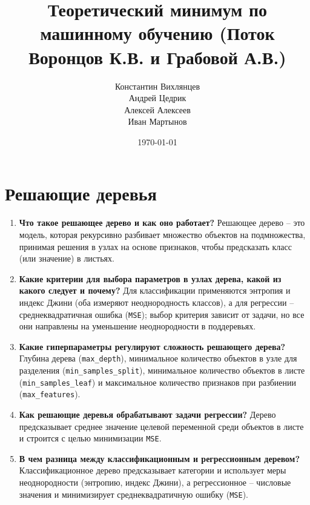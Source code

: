 \documentclass{article}
\title{Теоретический минимум по машинному обучению (Поток Воронцов К.В. и Грабовой А.В.)}
\author{Константин Вихлянцев \\ Андрей Цедрик \\ Алексей Алексеев \\ Иван Мартынов}
\date{\today}
\begin{document}
\maketitle

\newpage

\section{Решающие деревья}
\begin{enumerate}
    \item \textbf{Что такое решающее дерево и как оно работает?} Решающее дерево -- это модель, которая рекурсивно разбивает множество объектов на подмножества, принимая решения в узлах на основе признаков, чтобы предсказать класс (или значение) в листьях.
    \item \textbf{Какие критерии для выбора параметров в узлах дерева, какой из какого следует и почему?} Для классификации применяются энтропия и индекс Джини (оба измеряют неоднородность классов), а для регрессии -- среднеквадратичная ошибка (\texttt{MSE}); выбор критерия зависит от задачи, но все они направлены на уменьшение неоднородности в поддеревьях.
    \item \textbf{Какие гиперпараметры регулируют сложность решающего дерева?} Глубина дерева (\texttt{max\_depth}), минимальное количество объектов в узле для разделения (\texttt{min\_samples\_split}), минимальное количество объектов в листе (\texttt{min\_samples\_leaf}) и максимальное количество признаков при разбиении (\texttt{max\_features}).
    \item \textbf{Как решающие деревья обрабатывают задачи регрессии?} Дерево предсказывает среднее значение целевой переменной среди объектов в листе и строится с целью минимизации \texttt{MSE}.
    \item \textbf{В чем разница между классификационным и регрессионным деревом?} Классификационное дерево предсказывает категории и использует меры неоднородности (энтропию, индекс Джини), а регрессионное -- числовые значения и минимизирует среднеквадратичную ошибку (\texttt{MSE}).
\end{enumerate}
\end{document}
